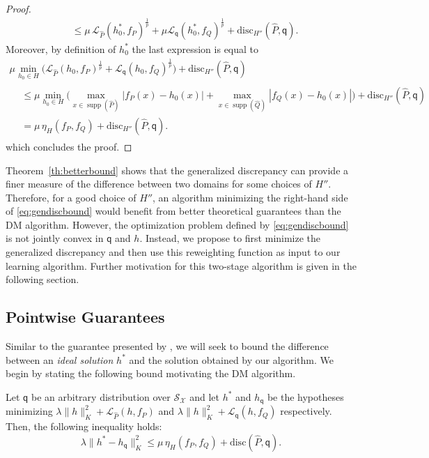 \documentclass[twoside,11pt]{article}
\DeclareMathOperator{\supp}{supp}
\providecommand{\norm}[2]{\lVert#1\rVert_{#2}}
\newcommand{\h}{\widehat}
\newcommand{\cL}{{\mathcal L}}
\newcommand{\cS}{{\mathcal S}}
\newcommand{\cX}{{\mathcal X}}
\newcommand{\1}{\mat{1}}
\newcommand{\qq}{{\mathsf q}}
\newcommand{\dis}{\mathrm{disc}}
\begin{document}
\begin{proof}
\begin{align*}
& \leq  \mu \, \cL_{\h P}(h^*_0, f_P)^{\frac{1}{p}} + \mu
  \cL_{\qq}(h^*_0, f_Q)^{\frac{1}{p}} + \dis_{H''}(\h P, \qq).
\end{align*}
Moreover, by definition of $h_0^*$ the last expression is equal to
\begin{multline*}
 \mu  \min_{h_0 \in H} \Big( \cL_{\h P}(h_0, f_P)^{\frac{1}{p}}
+ \cL_{\qq}(h_0, f_Q)^{\frac{1}{p}} \Big) + \dis_{H''}(\h P, \qq)  \\
\begin{aligned}
& \leq \mu \min_{h_0 \in H} \big(\max_{x \in \supp(\h P)}
  |f_P(x) - h_0(x)|  + \max_{x \in \supp(\h Q)} |f_Q(x) - h_0(x)|
  \big)  + \dis_{H''}(\h P, \qq) \\
& = \mu \, \eta_H(f_P, f_Q) + \dis_{H''}(\h P, \qq).
\end{aligned}
\end{multline*}
which concludes the proof.
\end{proof}

Theorem~\ref{th:betterbound} shows that the generalized discrepancy
can provide a finer measure of the difference between two domains for
some choices of $H''$. Therefore, for a good choice of $H''$, an
algorithm minimizing the right-hand side of \eqref{eq:gendiscbound}
would benefit from better theoretical guarantees than the DM
algorithm. However, the optimization problem defined by
\eqref{eq:gendiscbound} is not jointly convex in $\qq$ and $h$. Instead,
we propose to first minimize the generalized discrepancy and then use
this reweighting function as input to our learning algorithm. Further
motivation for this two-stage algorithm is given in the following
section.

\subsection{Pointwise Guarantees}
\label{sec:pointwiseguarantees}

Similar to  the guarantee presented by
\cite{CortesMohri2013}, we will seek to bound the difference between
an \emph{ideal solution} $h^*$ and the solution obtained by our
algorithm. We begin by stating the following bound motivating the DM
algorithm.

\begin{theorem}
\label{th:disc}
Let $\qq$ be an arbitrary distribution over $\cS_\cX$ and let $h^*$
and $h_\qq$ be the hypotheses minimizing
$\lambda \norm{h}{K}^2 + \cL_{\h P}(h, f_P)$ and
$\lambda \norm{h}{K}^2 + \cL_{\qq}(h, f_Q)$
respectively. Then, the following inequality holds:
\begin{equation}
\label{eq:disc}
\lambda \norm{h^* - h_\qq}{K}^2 \leq \mu \, \eta_H(f_P, f_Q) + \dis(\h
P, \qq).
\end{equation}
\end{theorem}
\end{document}
